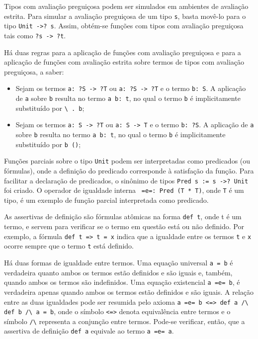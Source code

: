 Tipos com avaliação preguiçosa podem ser simulados em ambientes de avaliação estrita.
Para simular a avaliação preguiçosa de um tipo \Verb.s., basta movê-lo para o tipo \Verb.Unit ->? s..
Assim, obtém-se funções com tipos com avaliação preguiçosa tais como \Verb.?s -> ?t..

Há duas regras para a aplicação de funções com avaliação preguiçosa e para a aplicação de funções com avaliação estrita sobre termos de tipos com avaliação preguiçosa, a saber:

\begin{itemize}
	\item Sejam os termos \Verb.a: ?S -> ?T. ou \Verb.a: ?S -> ?T. e o termo \Verb.b: S.. A aplicação de \Verb.a. sobre \Verb.b. resulta no termo \Verb.a b: t., no qual o termo \Verb.b. é implicitamente substituído por \Verb_\ . b_;
	\item Sejam os termos \Verb.a: S -> ?T. ou \Verb.a: S -> T. e o termo \Verb.b: ?S.. A aplicação de \Verb.a. sobre \Verb.b. resulta no termo \Verb.a b: t., no qual o termo \Verb.b. é implicitamente substituído por \Verb.b ().;
\end{itemize}

Funções parciais sobre o tipo \Verb.Unit. podem ser interpretadas como predicados (ou fórmulas), onde a definição do predicado corresponde à satisfação da função.
Para facilitar a declaração de predicados, o sinônimo de tipos \Verb.Pred s := s ->? Unit. foi criado.
O operador de igualdade interna \Verb. =e=: Pred (T * T)., onde \Verb.T. é um tipo, é um exemplo de função parcial interpretada como predicado.

As assertivas de definição são fórmulas atômicas na forma \Verb.def t., onde t é um termo, e servem para verificar se o termo em questão está ou não definido.
Por exemplo, a fórmula \Verb.def t => t = x. indica que a igualdade entre os termos \Verb.t. e \Verb.x. ocorre sempre que o termo \Verb.t. está definido.

Há duas formas de igualdade entre termos.
Uma equação universal \Verb.a = b. é verdadeira quanto ambos os termos estão definidos e são iguais e, também, quando ambos os termos são indefinidos.
Uma equação existencial \Verb.a =e= b., é verdadeira apenas quando ambos os termos estão definidos e são iguais.
A relação entre as duas igualdades pode ser resumida pelo axioma \Verb.a =e= b <=> def a /\ def b /\ a = b., onde o símbolo \Verb.<=>. denota equivalência entre termos e o símbolo \Verb./\. representa a conjunção entre termos.
Pode-se verificar, então, que a assertiva de definição \Verb.def a. equivale ao termo \Verb.a =e= a..

